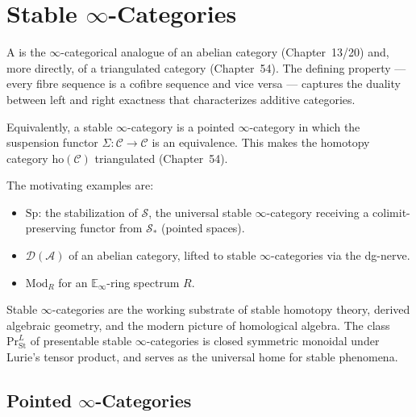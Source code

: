 
\chapter{Stable $\infty$-Categories}

\begin{overviewbox}
A  is the $\infty$-categorical analogue of
an abelian category (Chapter~13/20) and, more directly, of a triangulated
category (Chapter~54). The defining property — every fibre sequence is a
cofibre sequence and vice versa — captures the duality between left and
right exactness that characterizes additive categories.

Equivalently, a stable $\infty$-category is a pointed $\infty$-category
in which the suspension functor $\Sigma : \mathcal{C} \to \mathcal{C}$ is
an equivalence. This makes the homotopy category $\mathrm{ho}(\mathcal{C})$
triangulated (Chapter~54).

The motivating examples are:
\begin{itemize}
  \item {} $\mathrm{Sp}$: the stabilization of $\mathcal{S}$,
        the universal stable $\infty$-category receiving a colimit-preserving
        functor from $\mathcal{S}_*$ (pointed spaces).
  \item {} $\mathcal{D}(\mathcal{A})$ of an abelian
        category, lifted to stable $\infty$-categories via the dg-nerve.
  \item {} $\mathrm{Mod}_R$ for an
        $\mathbb{E}_\infty$-ring spectrum $R$.
\end{itemize}

Stable $\infty$-categories are the working substrate of stable homotopy
theory, derived algebraic geometry, and the modern picture of homological
algebra. The class $\mathrm{Pr}^L_{\mathrm{St}}$ of presentable stable
$\infty$-categories is closed symmetric monoidal under Lurie's tensor
product, and serves as the universal home for stable phenomena.
\end{overviewbox}


\section{Pointed $\infty$-Categories}
\label{sec:pointed}

